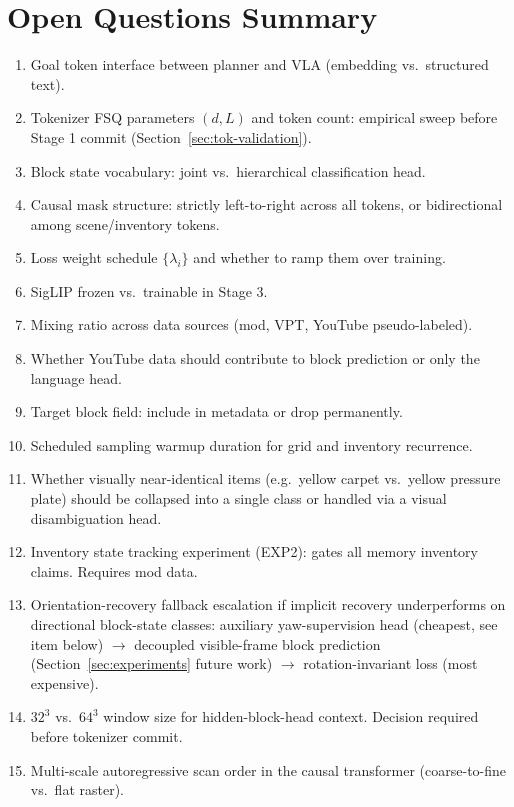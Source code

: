 \documentclass[11pt,a4paper]{article}
\begin{document}
\section{Open Questions Summary}

\begin{enumerate}
  \item Goal token interface between planner and VLA (embedding vs.\ structured text).
  \item Tokenizer FSQ parameters $(d, L)$ and token count: empirical sweep before Stage 1 commit (Section~\ref{sec:tok-validation}).
  \item Block state vocabulary: joint vs.\ hierarchical classification head.
  \item Causal mask structure: strictly left-to-right across all tokens, or bidirectional among scene/inventory tokens.
  \item Loss weight schedule $\{\lambda_i\}$ and whether to ramp them over training.
  \item SigLIP frozen vs.\ trainable in Stage 3.
  \item Mixing ratio across data sources (mod, VPT, YouTube pseudo-labeled).
  \item Whether YouTube data should contribute to block prediction or only the language head.
  \item Target block field: include in metadata or drop permanently.
  \item Scheduled sampling warmup duration for grid and inventory recurrence.
  \item Whether visually near-identical items (e.g.\ yellow carpet vs.\ yellow pressure plate) should be collapsed into a single class or handled via a visual disambiguation head.
  \item Inventory state tracking experiment (EXP2): gates all memory inventory claims. Requires mod data.
  \item Orientation-recovery fallback escalation if implicit recovery underperforms on directional block-state classes: auxiliary yaw-supervision head (cheapest, see item below) $\to$ decoupled visible-frame block prediction (Section~\ref{sec:experiments} future work) $\to$ rotation-invariant loss (most expensive).
  \item $32^3$ vs.\ $64^3$ window size for hidden-block-head context. Decision required before tokenizer commit.
  \item Multi-scale autoregressive scan order in the causal transformer (coarse-to-fine vs.\ flat raster).

\end{enumerate}
\end{document}
